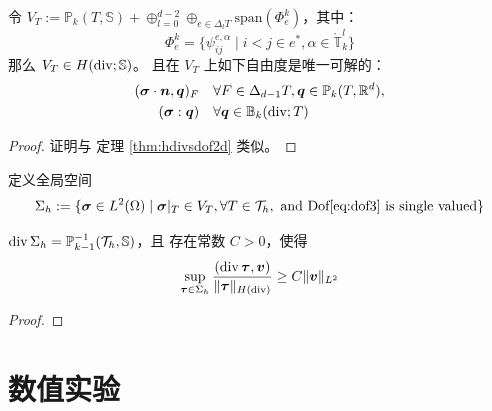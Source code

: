 \documentclass[letterpaper,12pt]{article}
\begin{document}
\begin{theorem}
\label{thm:hdivsdofnd}
    令 $V_T := \mathbb{P}_k(T, \mathbb{S}) + \oplus_{l = 0}^{d-2} \oplus_{e \in
    \Delta_{l} T} \mathrm{span}(\Phi_e^k)$，其中：
    $$
    \Phi_e^k = \{\psi_{ij}^{e, \alpha} \mid i < j \in e^*, \alpha \in
    \mathring{\mathbb{T}}_k^{l}\}
    $$
    那么 $V_T \in H(\operatorname{div}; \mathbb{S})$。
    且在 $V_T$ 上如下自由度是唯一可解的：
    \begin{align}
        (\boldsymbol{\sigma}\cdot \boldsymbol{n}, \boldsymbol{q})_F  & \quad \forall F \in
        \Delta_{d-1} T, \boldsymbol{q} \in \mathbb{P}_k(T, \mathbb{R}^d), \label{eq:dof3}\\
    (\boldsymbol{\sigma} : \boldsymbol{q}) & \quad \forall \boldsymbol{q} \in
    \mathbb{B}_k(\operatorname{div}; T)\label{eq:dof4}
    \end{align}
\end{theorem}
\begin{proof}
    证明与 定理 \ref{thm:hdivsdof2d} 类似。
\end{proof}

定义全局空间
$$
\Sigma_h := \{\boldsymbol{\sigma} \in L^2(\Omega) \mid \boldsymbol{\sigma}|_T \in V_T, \forall T \in
\mathcal{T}_h, \text{ and Dof} \eqref{eq:dof3} \text{ is single valued}\}
$$


\begin{theorem}
    \label{thm:infsup}
    $\operatorname{div}\Sigma_h = \mathbb{P}_{k-1}^{-1}(\mathcal{T}_h, \mathbb{S})$，且
    存在常数 $C > 0$，使得
    \begin{equation}
        \label{eq:infsup}
        \sup_{\boldsymbol{\tau} \in \Sigma_h} 
        \frac{(\operatorname{div}\boldsymbol{\tau}, \boldsymbol{v})}{\|\boldsymbol{\tau}\|_{H(\operatorname{div})}}
        \geq C \|\boldsymbol{v}\|_{L^2}
    \end{equation}
\end{theorem}
\begin{proof}
\end{proof}








\section{数值实验}
\end{document}
